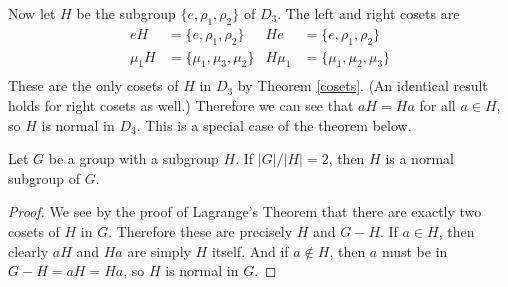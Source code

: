 \begin{example}
Now let $H$ be the subgroup $\{e, \rho_1, \rho_2\}$ of $D_3$. The left and right cosets are
\begin{align*}
    eH      &= \{e, \rho_1, \rho_2\}   & He &= \{e, \rho_1, \rho_2\} \\
    \mu_1 H &= \{\mu_1, \mu_3, \mu_2\} & H \mu_1 &= \{\mu_1, \mu_2, \mu_3\} \\
\end{align*}
These are the only cosets of $H$ in $D_3$ by Theorem \ref{cosets}. (An identical result holds for right cosets as well.) Therefore we can see that $aH = Ha$ for all $a \in H$, so $H$ is normal in $D_3$. This is a special case of the theorem below.
\end{example}

\begin{theorem}
Let \extra $G$ be a group with a subgroup $H$. If $|G|/|H| = 2$, then $H$ is a normal subgroup of $G$.
\end{theorem}

\begin{proof}
We see by the proof of Lagrange's Theorem that there are exactly two cosets of $H$ in $G$. Therefore these are precisely $H$ and $G - H$. If $a \in H$, then clearly $aH$ and $Ha$ are simply $H$ itself. And if $a \notin H$, then $a$ must be in $G-H = aH = Ha$, so $H$ is normal in $G$. 
\end{proof}